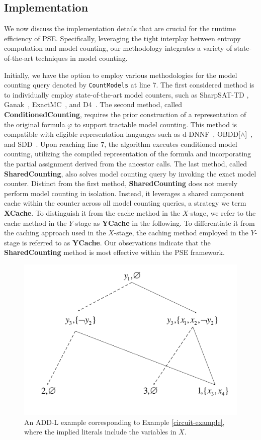 \subsection{Implementation}

We now discuss the implementation details that are crucial for the runtime efficiency of PSE. 
Specifically, leveraging the tight interplay between entropy computation and model counting, our methodology integrates a variety of state-of-the-art techniques in model counting.

Initially, we have the option to employ various methodologies for the model counting query denoted by \texttt{CountModels} at line 7.
The first considered method is to individually employ state-of-the-art model counters, such as SharpSAT-TD \cite{korhonen2021integrating}, Ganak~\cite{sharma2019ganak}, ExactMC~\cite{lai2021power}, and D4~\cite{lagniez2017improved}.
The second method, called \textbf{ConditionedCounting}, requires the prior construction of a representation of the original formula $\varphi$ to support tractable model counting.
This method is compatible with eligible representation languages such as d-DNNF~\cite{darwiche2004new}, OBDD[$\land$]~\cite{lai2017new}, and SDD~\cite{choi2013compiling}.
Upon reaching line 7, the algorithm executes conditioned model counting, utilizing the compiled representation of the formula and incorporating the partial assignment derived from the ancestor calls.
The last method, called \textbf{SharedCounting}, also solves model counting query by invoking the exact model counter.
Distinct from the first method, \textbf{SharedCounting} does not merely perform model counting in isolation.
Instead, it leverages a shared component cache within the counter across all model counting queries, a strategy we term \textbf{XCache}.
To distinguish it from the cache method in the $X$-stage, we refer to the cache method in the $Y$-stage as \textbf{YCache} in the following.
To differentiate it from the caching approach used in the $X$-stage, the caching method employed in the $Y$-stage is referred to as \textbf{YCache}.
Our observations indicate that the \textbf{SharedCounting} method is most effective within the PSE framework.

\begin{figure}[!htbp]
	
	\centering
	\includegraphics[width=0.7\linewidth]{figures/ADD-L-example2.pdf}
	\caption{An ADD-L example corresponding to Example \ref{circuit-example}, where the implied literals include the variables in $X$. }
	\label{fig:ADDL-example2}
\end{figure} 

